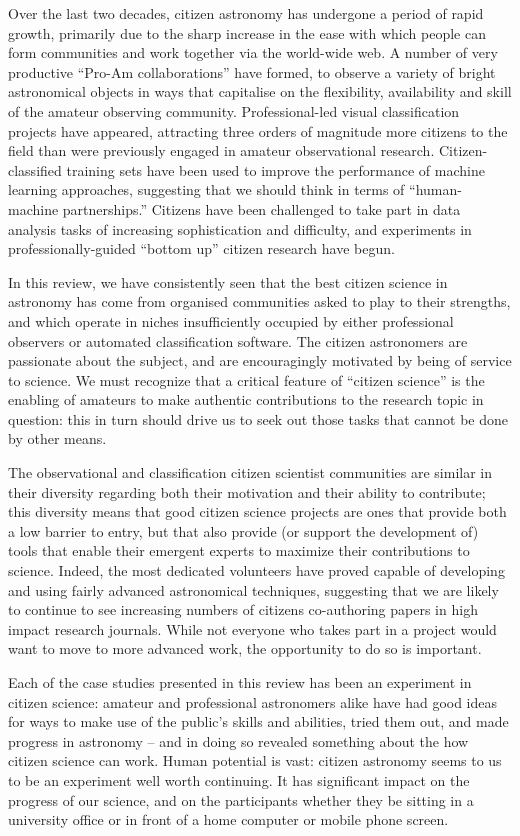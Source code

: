 \documentclass{ar2e}
\begin{document}
Over the last two decades, citizen astronomy has undergone a period of rapid
growth, primarily due to the sharp increase in the ease with which people can
form communities and work together via the world-wide web.   A number of very
productive ``Pro-Am collaborations'' have formed, to observe a variety of bright
astronomical objects in ways that capitalise on the flexibility, availability
and skill of the amateur observing community. Professional-led visual
classification projects have appeared, attracting three orders of magnitude more
citizens to the field than were previously engaged in amateur observational
research. Citizen-classified training sets have been used to improve the
performance of  machine learning approaches, suggesting that we should think in
terms of ``human-machine partnerships.'' Citizens have been challenged to take
part in data analysis tasks of increasing sophistication and difficulty, and
experiments in professionally-guided ``bottom up'' citizen research have begun.

In this review, we have consistently seen that the best citizen science in
astronomy has come from organised communities asked to play to their strengths,
and which operate in niches insufficiently occupied by either professional observers or
automated classification software. The citizen astronomers are passionate about
the subject, and are encouragingly motivated by being of service to science. We must recognize
that a critical feature of ``citizen science'' is the enabling of amateurs to
make authentic contributions to the research topic in question: this in turn
should drive us to seek out those  tasks that cannot be done by other means. 

The observational and classification citizen scientist communities are similar
in their diversity regarding both their motivation and their ability to
contribute;  this diversity means that good citizen science projects are ones
that provide both a low barrier to entry, but that also provide (or support the
development of) tools that enable their emergent experts to maximize their
contributions to science.  Indeed, the most dedicated volunteers have proved
capable of developing and using fairly advanced astronomical techniques,
suggesting that we are likely to continue to see increasing numbers of citizens
co-authoring papers in high impact research journals. While not everyone who
takes part in a project would want to move to more advanced work, the opportunity
to do so is important.

Each of the case studies presented in this review has been an experiment in
citizen science: amateur and professional astronomers alike have had good ideas
for ways to make use of the public's skills and abilities, tried them out, and 
made progress in astronomy -- and in doing so revealed something about the how
citizen science can work. Human potential is vast: citizen astronomy seems to us
to be an experiment well worth continuing. It has significant impact on the progress
of our science, and on the participants whether they be sitting in a university office or
in front of a home computer or mobile phone screen. 
\end{document}
